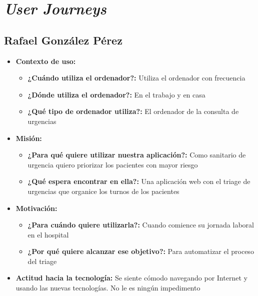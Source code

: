 
\section{\textit{User Journeys}}\label{anexo}

\subsection{Rafael González Pérez}
\begin{itemize}
    \item \textbf{Contexto de uso: }
          \begin{itemize}
              \item \textbf{¿Cuándo utiliza el ordenador?: }  Utiliza el ordenador con frecuencia
              \item \textbf{¿Dónde utiliza el ordenador?: } En el trabajo y en casa
              \item \textbf{¿Qué tipo de ordenador utiliza?: } El ordenador de la consulta de urgencias
          \end{itemize}
    \item \textbf{Misión: }
          \begin{itemize}
              \item \textbf{¿Para qué quiere utilizar nuestra aplicación?: } Como sanitario de urgencia quiero priorizar los pacientes con mayor riesgo
              \item \textbf{¿Qué espera encontrar en ella?: } Una aplicación web con el triage de urgencias que organice los turnos de los pacientes
          \end{itemize}
    \item \textbf{Motivación: }
          \begin{itemize}
              \item \textbf{¿Para cuándo quiere utilizarla?: } Cuando comience su jornada laboral en el hospital
              \item \textbf{¿Por qué quiere alcanzar ese objetivo?: } Para automatizar el proceso del triage
          \end{itemize}
    \item \textbf{Actitud hacia la tecnología: } Se siente cómodo navegando por Internet y usando las nuevas tecnologías. No le es ningún impedimento
\end{itemize}

